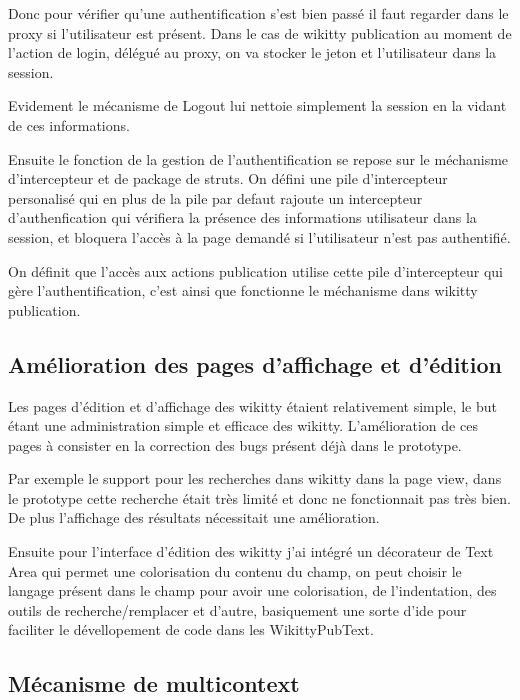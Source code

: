 Donc pour vérifier qu'une authentification s'est bien passé il faut regarder
dans le proxy si l'utilisateur est présent. Dans le cas de wikitty publication
au moment de l'action de login, délégué au proxy, on va stocker le jeton et
l'utilisateur dans la session.

Evidement le mécanisme de Logout lui nettoie simplement la session en la vidant
de ces informations.

Ensuite le fonction de la gestion de l'authentification se repose sur le
méchanisme d'intercepteur et de package de struts. On défini une pile
d'intercepteur personalisé qui en plus de la pile par defaut rajoute un
intercepteur d'authenfication qui vérifiera la présence des informations
utilisateur dans la session, et bloquera l'accès à la page demandé si
l'utilisateur n'est pas authentifié.

On définit que l'accès aux actions publication utilise cette pile d'intercepteur
qui gère l'authentification, c'est ainsi que fonctionne le méchanisme dans
wikitty publication.

\subsection{Amélioration des pages d'affichage et d'édition}

Les pages d'édition et d'affichage des wikitty étaient relativement simple, le
but étant une administration simple et efficace des wikitty. L'amélioration de
ces pages à consister en la correction des bugs présent déjà dans le prototype.

Par exemple le support pour les recherches dans wikitty dans la page view,
dans le prototype cette recherche était très limité et donc ne fonctionnait pas
très bien. De plus l'affichage des résultats nécessitait une amélioration.

Ensuite pour l'interface d'édition des wikitty j'ai intégré un décorateur de
Text Area qui permet une colorisation du contenu du champ, on peut choisir le
langage présent dans le champ pour avoir une colorisation, de l'indentation, des
outils de recherche/remplacer et d'autre, basiquement une sorte d'ide pour
faciliter le dévellopement de code dans les WikittyPubText.



\subsection{Mécanisme de multicontext}

